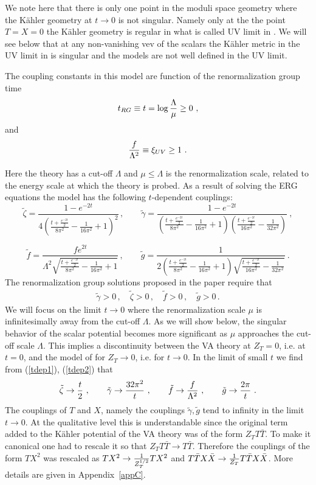 \documentclass[11pt]{article}
\newcommand{\be}{\begin{equation}}
\newcommand{\ee}{\end{equation}}
\newcommand{\bea}{\begin{eqnarray}}
\newcommand{\eea}{\end{eqnarray}}
\def\K{K{\"a}hler }
\newcommand{\rf}[1]{(\ref{#1})}
\def\be{\begin{equation}}
\def\ee{\end{equation}}
\def\bea{\begin{eqnarray}}
\def\eea{\end{eqnarray}}
\begin{document}
We note here that there is only one point in the moduli space geometry where the \K geometry at $t\to 0$ is not singular. Namely only at the the point $T=X=0$ the \K geometry is regular in what is called UV limit in  \cite{DallAgata:2022abm}. We will see below that at any  non-vanishing vev of the scalars the \K metric in the UV limit in  \cite{DallAgata:2022abm} is singular and the models are not well defined in the UV limit.


The coupling constants in this model are function of the renormalization group time 
\be
t_{RG}\equiv t= \log {\Lambda\over \mu}\geq 0 \ ,
\ee 
and 
\be
{f\over \Lambda^2} \equiv \xi_{UV}\geq 1\ .
\ee

Here the theory has  a cut-off  $\Lambda$ and $\mu\leq \Lambda $ is the  renormalization scale,  related to the energy scale at which  the theory is probed.
As a result of solving the ERG equations the model has the following $t$-dependent couplings:
\be
\tilde \zeta =\frac{1-e^{-2 t}}{4 \left(\frac{t+\frac{e^{-2 t}}{2}}{8 \pi ^2}-\frac{1}{16 \pi ^2}+1\right)^2}\, ,  \qquad 
\tilde \gamma =\frac{1-e^{-2 t}}{\left(\frac{t+\frac{e^{-2 t}}{2}}{8 \pi ^2}-\frac{1}{16 \pi ^2}+1\right) \left(\frac{t+\frac{e^{-2 t}}{2}}{16 \pi ^2}-\frac{1}{32 \pi ^2}\right)}  \ ,
\label{tdep1}\ee

  \be
\tilde f=\frac{f  e^{2 t}}{\Lambda^2 \sqrt{\frac{t+\frac{e^{-2 t}}{2}}{8 \pi ^2}-\frac{1}{16 \pi ^2}+1}} \, , \qquad 
\tilde g=\frac{1}{2 \left(\frac{t+\frac{e^{-2 t}}{2}}{8 \pi ^2}-\frac{1}{16 \pi ^2}+1\right) \sqrt{\frac{t+\frac{e^{-2 t}}{2}}{16 \pi ^2}-\frac{1}{32 \pi ^2}}} \ .
\label{tdep2}\ee
The  renormalization group solutions proposed in the paper  \cite{DallAgata:2022abm} require that
 \bea
\tilde \gamma  >0\, , \quad
\tilde \zeta  >0\, , \quad
\tilde f  >0\, , \quad
 \tilde g  >0\, .
\label{pos}\eea
We will focus on the limit $t\to0$ where the renormalization scale $\mu$ is infinitesimally away from the cut-off $\Lambda$. As we will show below, the singular behavior of the scalar potential becomes more significant as $\mu$ approaches the cut-off scale $\Lambda$. This implies a discontinuity between the VA theory at $Z_T=0$, i.e. at $t=0$, and the model of \cite{DallAgata:2022abm} for $Z_T \to 0$, i.e. for $t\to0$. In the limit of small $t$ we find from \rf{tdep1}, \rf{tdep2} that
\be
\tilde \zeta  \to {t\over 2}\ , \qquad 
\tilde \gamma  \to {32 \pi^2\over   t}\ , \qquad 
\tilde f \to {f \over \Lambda^2 } \ , \qquad 
\tilde g \to {2\pi\over   t} \ .
\label{smallt}\ee
The couplings of  $T$ and $X$, namely the couplings  $\tilde \gamma, \tilde g$  tend to infinity in the limit $t\rightarrow 0$. At the qualitative level  this is understandable since the original term added to the \K potential of the VA theory was of the form $Z_T T \bar T$. To make it canonical one had to rescale it so that 
$Z_T T \bar T \to T\bar T$. Therefore the couplings of the form $TX^2$ was rescaled as $TX^2 \to {1\over Z_T^{1/2} } TX^2$ and $T\bar T X\bar X \to  {1\over Z_T } T\bar T X\bar X$. More details are given in Appendix~\ref{appC}.
\end{document}
